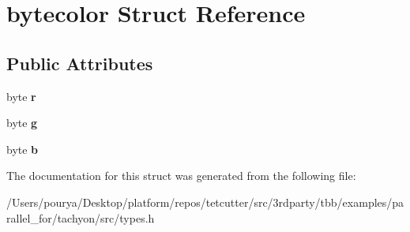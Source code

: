 \hypertarget{structbytecolor}{}\section{bytecolor Struct Reference}
\label{structbytecolor}
\subsection*{Public Attributes}
\begin{DoxyCompactItemize}
\item 
\hypertarget{structbytecolor_a7a018833222d069ad022c346f95f0c4f}{}byte {\bfseries r}\label{structbytecolor_a7a018833222d069ad022c346f95f0c4f}

\item 
\hypertarget{structbytecolor_a0b6c3ddbf666e5b9ac7d5cd2be5e9186}{}byte {\bfseries g}\label{structbytecolor_a0b6c3ddbf666e5b9ac7d5cd2be5e9186}

\item 
\hypertarget{structbytecolor_a9c0ed2b5528c0f96fe9e089b34180b9c}{}byte {\bfseries b}\label{structbytecolor_a9c0ed2b5528c0f96fe9e089b34180b9c}

\end{DoxyCompactItemize}


The documentation for this struct was generated from the following file\+:\begin{DoxyCompactItemize}
\item 
/\+Users/pourya/\+Desktop/platform/repos/tetcutter/src/3rdparty/tbb/examples/parallel\+\_\+for/tachyon/src/types.\+h\end{DoxyCompactItemize}
